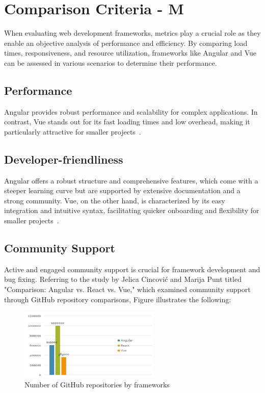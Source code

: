 \section {Comparison Criteria - M}

When evaluating web development frameworks, metrics play a crucial role as they enable an objective analysis of performance and efficiency. By comparing load times, responsiveness, and resource utilization, frameworks like Angular and Vue can be assessed in various scenarios to determine their performance.

\subsection{Performance}
Angular provides robust performance and scalability for complex applications. In contrast, Vue stands out for its fast loading times and low overhead, making it particularly attractive for smaller projects~\cite{verma2022comparison}.

\subsection{Developer-friendliness}
Angular offers a robust structure and comprehensive features, which come with a steeper learning curve but are supported by extensive documentation and a strong community. Vue, on the other hand, is characterized by its easy integration and intuitive syntax, facilitating quicker onboarding and flexibility for smaller projects~\cite{angular, vue}.

\subsection{Community Support}
Active and engaged community support is crucial for framework development and bug fixing. Referring to the study by Jelica Cincović and Marija Punt titled "Comparison: Angular vs. React vs. Vue," which examined community support through GitHub repository comparisons, Figure  illustrates the following:

\begin{figure}[h]
    \centering
    \includegraphics[width=0.6\textwidth]{image.png}
    \caption{Number of GitHub repositories by frameworks}
    \label{fig:github_repos}
\end{figure}

